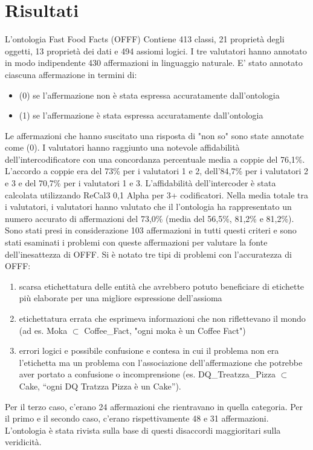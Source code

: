 \section{Risultati}
L'ontologia Fast Food Facts (OFFF) Contiene 413 classi, 21 proprietà degli oggetti, 13 proprietà dei dati e 494 assiomi logici. I tre valutatori hanno annotato in modo indipendente 430 affermazioni in linguaggio naturale. E' stato annotato ciascuna affermazione in termini di:
\begin{itemize}
    \item (0) se l'affermazione non è stata espressa accuratamente dall'ontologia
    \item (1) se l'affermazione è stata espressa accuratamente dall'ontologia
\end{itemize}
Le affermazioni che hanno suscitato una risposta di "non so" sono state annotate come (0). I valutatori hanno raggiunto una notevole affidabilità dell'intercodificatore con una concordanza percentuale media a coppie del 76,1\%. 
L'accordo a coppie era del 73\% per i valutatori 1 e 2, dell'84,7\% per i valutatori 2 e 3 e del 70,7\% per i valutatori 1 e 3. 
L'affidabilità dell'intercoder è stata calcolata utilizzando ReCal3 0,1 Alpha per 3+ codificatori. 
Nella media totale tra i valutatori, i valutatori hanno valutato che il l'ontologia ha rappresentato un numero accurato di affermazioni del 73,0\% (media del 56,5\%, 81,2\% e 81,2\%). 
Sono stati presi in considerazione 103 affermazioni in tutti questi criteri e sono stati esaminati i problemi con queste affermazioni per valutare la fonte dell'inesattezza di OFFF. 
Si è notato tre tipi di problemi con l'accuratezza di OFFF: 
\begin{enumerate}
    \item scarsa etichettatura delle entità che avrebbero potuto beneficiare di etichette più elaborate per una migliore espressione dell'assioma
    \item etichettatura errata che esprimeva informazioni che non riflettevano il mondo (ad es. Moka $\subset$ Coffee\_Fact, "ogni moka è un Coffee Fact")
    \item errori logici e possibile confusione e contesa in cui il problema non era l'etichetta ma un problema con l'associazione dell'affermazione che potrebbe aver portato a confusione o incomprensione (es. DQ\_Treatzza\_Pizza $\subset$ Cake, “ogni DQ Tratzza Pizza è un Cake”).
\end{enumerate}
Per il terzo caso, c'erano 24 affermazioni che rientravano in quella categoria. Per il primo e il secondo caso, c'erano rispettivamente 48 e 31 affermazioni. L'ontologia è stata rivista sulla base di questi disaccordi maggioritari sulla veridicità. 
